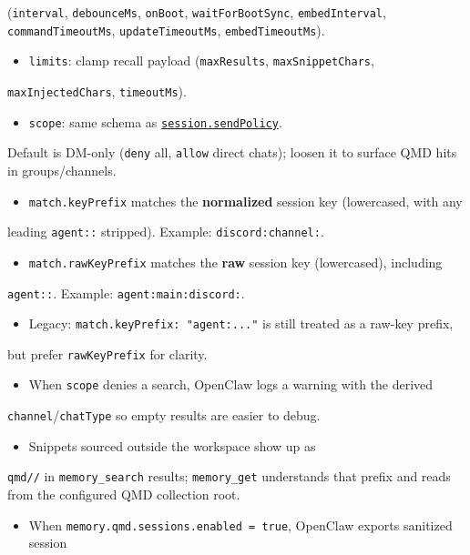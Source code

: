 (\texttt{interval}, \texttt{debounceMs}, \texttt{onBoot}, \texttt{waitForBootSync}, \texttt{embedInterval},
\texttt{commandTimeoutMs}, \texttt{updateTimeoutMs}, \texttt{embedTimeoutMs}).
\begin{itemize}
  \item \texttt{limits}: clamp recall payload (\texttt{maxResults}, \texttt{maxSnippetChars},
\end{itemize}

\texttt{maxInjectedChars}, \texttt{timeoutMs}).
\begin{itemize}
  \item \texttt{scope}: same schema as \href{/gateway/configuration\#session}{\texttt{session.sendPolicy}}.
\end{itemize}

Default is DM-only (\texttt{deny} all, \texttt{allow} direct chats); loosen it to surface QMD
hits in groups/channels.
\begin{itemize}
  \item \texttt{match.keyPrefix} matches the \textbf{normalized} session key (lowercased, with any
\end{itemize}

leading \texttt{agent::} stripped). Example: \texttt{discord:channel:}.
\begin{itemize}
  \item \texttt{match.rawKeyPrefix} matches the \textbf{raw} session key (lowercased), including
\end{itemize}

\texttt{agent::}. Example: \texttt{agent:main:discord:}.
\begin{itemize}
  \item Legacy: \texttt{match.keyPrefix: "agent:..."} is still treated as a raw-key prefix,
\end{itemize}

but prefer \texttt{rawKeyPrefix} for clarity.
\begin{itemize}
  \item When \texttt{scope} denies a search, OpenClaw logs a warning with the derived
\end{itemize}

\texttt{channel}/\texttt{chatType} so empty results are easier to debug.
\begin{itemize}
  \item Snippets sourced outside the workspace show up as
\end{itemize}

\texttt{qmd//} in \texttt{memory\_search} results; \texttt{memory\_get}
understands that prefix and reads from the configured QMD collection root.
\begin{itemize}
  \item When \texttt{memory.qmd.sessions.enabled = true}, OpenClaw exports sanitized session
\end{itemize}

